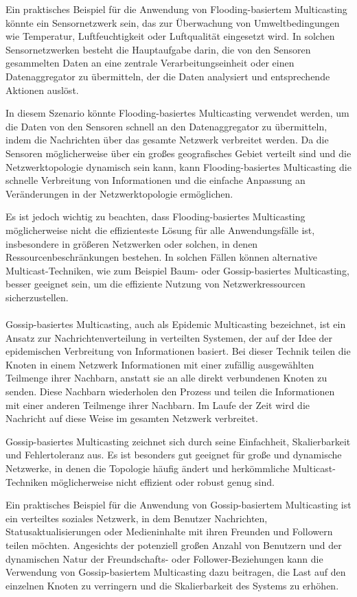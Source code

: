 \documentclass[../vs-script-first-v01.tex]{subfiles}
\begin{document}
Ein praktisches Beispiel für die Anwendung von Flooding-basiertem Multicasting könnte ein Sensornetzwerk sein, das zur Überwachung von Umweltbedingungen wie Temperatur, Luftfeuchtigkeit oder Luftqualität eingesetzt wird. In solchen Sensornetzwerken besteht die Hauptaufgabe darin, die von den Sensoren gesammelten Daten an eine zentrale Verarbeitungseinheit oder einen Datenaggregator zu übermitteln, der die Daten analysiert und entsprechende Aktionen auslöst.

In diesem Szenario könnte Flooding-basiertes Multicasting verwendet werden, um die Daten von den Sensoren schnell an den Datenaggregator zu übermitteln, indem die Nachrichten über das gesamte Netzwerk verbreitet werden. Da die Sensoren möglicherweise über ein großes geografisches Gebiet verteilt sind und die Netzwerktopologie dynamisch sein kann, kann Flooding-basiertes Multicasting die schnelle Verbreitung von Informationen und die einfache Anpassung an Veränderungen in der Netzwerktopologie ermöglichen.

Es ist jedoch wichtig zu beachten, dass Flooding-basiertes Multicasting möglicherweise nicht die effizienteste Lösung für alle Anwendungsfälle ist, insbesondere in größeren Netzwerken oder solchen, in denen Ressourcenbeschränkungen bestehen. In solchen Fällen können alternative Multicast-Techniken, wie zum Beispiel Baum- oder Gossip-basiertes Multicasting, besser geeignet sein, um die effiziente Nutzung von Netzwerkressourcen sicherzustellen.
\\\\
Gossip-basiertes Multicasting, auch als Epidemic Multicasting bezeichnet, ist ein Ansatz zur Nachrichtenverteilung in verteilten Systemen, der auf der Idee der epidemischen Verbreitung von Informationen basiert. Bei dieser Technik teilen die Knoten in einem Netzwerk Informationen mit einer zufällig ausgewählten Teilmenge ihrer Nachbarn, anstatt sie an alle direkt verbundenen Knoten zu senden. Diese Nachbarn wiederholen den Prozess und teilen die Informationen mit einer anderen Teilmenge ihrer Nachbarn. Im Laufe der Zeit wird die Nachricht auf diese Weise im gesamten Netzwerk verbreitet.

Gossip-basiertes Multicasting zeichnet sich durch seine Einfachheit, Skalierbarkeit und Fehlertoleranz aus. Es ist besonders gut geeignet für große und dynamische Netzwerke, in denen die Topologie häufig ändert und herkömmliche Multicast-Techniken möglicherweise nicht effizient oder robust genug sind.

Ein praktisches Beispiel für die Anwendung von Gossip-basiertem Multicasting ist ein verteiltes soziales Netzwerk, in dem Benutzer Nachrichten, Statusaktualisierungen oder Medieninhalte mit ihren Freunden und Followern teilen möchten. Angesichts der potenziell großen Anzahl von Benutzern und der dynamischen Natur der Freundschafts- oder Follower-Beziehungen kann die Verwendung von Gossip-basiertem Multicasting dazu beitragen, die Last auf den einzelnen Knoten zu verringern und die Skalierbarkeit des Systems zu erhöhen.
\end{document}
